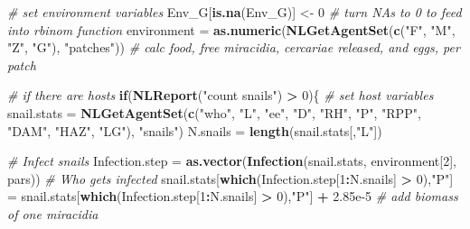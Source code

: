 \documentclass[10,portrait]{article}
\newenvironment{Shaded}{\begin{snugshade}}{\end{snugshade}}
\newcommand{\KeywordTok}[1]{\textcolor[rgb]{0.13,0.29,0.53}{\textbf{#1}}}
\newcommand{\DecValTok}[1]{\textcolor[rgb]{0.00,0.00,0.81}{#1}}
\newcommand{\FloatTok}[1]{\textcolor[rgb]{0.00,0.00,0.81}{#1}}
\newcommand{\StringTok}[1]{\textcolor[rgb]{0.31,0.60,0.02}{#1}}
\newcommand{\CommentTok}[1]{\textcolor[rgb]{0.56,0.35,0.01}{\textit{#1}}}
\newcommand{\ControlFlowTok}[1]{\textcolor[rgb]{0.13,0.29,0.53}{\textbf{#1}}}
\newcommand{\OperatorTok}[1]{\textcolor[rgb]{0.81,0.36,0.00}{\textbf{#1}}}
\newcommand{\NormalTok}[1]{#1}
\begin{document}
\begin{Shaded}
\begin{Highlighting}[]
{{{{{                      \CommentTok{# set environment variables }
\NormalTok{                      Env_G[}\KeywordTok{is.na}\NormalTok{(Env_G)] <-}\StringTok{ }\DecValTok{0} \CommentTok{# turn NAs to 0 to feed into rbinom function }
\NormalTok{                      environment =}\StringTok{ }\KeywordTok{as.numeric}\NormalTok{(}\KeywordTok{NLGetAgentSet}\NormalTok{(}\KeywordTok{c}\NormalTok{(}\StringTok{"F"}\NormalTok{, }\StringTok{"M"}\NormalTok{, }\StringTok{"Z"}\NormalTok{, }\StringTok{"G"}\NormalTok{), }\StringTok{"patches"}\NormalTok{)) }\CommentTok{# calc food, free miracidia, cercariae released, and eggs, per patch}
                      
                      \CommentTok{# if there are hosts }
                      \ControlFlowTok{if}\NormalTok{(}\KeywordTok{NLReport}\NormalTok{(}\StringTok{"count snails"}\NormalTok{) }\OperatorTok{>}\StringTok{ }\DecValTok{0}\NormalTok{)\{}
                        \CommentTok{# set host variables}
\NormalTok{                        snail.stats =}\StringTok{ }\KeywordTok{NLGetAgentSet}\NormalTok{(}\KeywordTok{c}\NormalTok{(}\StringTok{"who"}\NormalTok{, }\StringTok{"L"}\NormalTok{, }\StringTok{"ee"}\NormalTok{, }\StringTok{"D"}\NormalTok{, }\StringTok{"RH"}\NormalTok{, }\StringTok{"P"}\NormalTok{, }\StringTok{"RPP"}\NormalTok{, }\StringTok{"DAM"}\NormalTok{, }\StringTok{"HAZ"}\NormalTok{, }\StringTok{"LG"}\NormalTok{), }\StringTok{"snails"}\NormalTok{)}
\NormalTok{                        N.snails =}\StringTok{ }\KeywordTok{length}\NormalTok{(snail.stats[,}\StringTok{"L"}\NormalTok{])}
                        
                        \CommentTok{# Infect snails}
\NormalTok{                        Infection.step =}\StringTok{ }\KeywordTok{as.vector}\NormalTok{(}\KeywordTok{Infection}\NormalTok{(snail.stats, environment[}\DecValTok{2}\NormalTok{], pars)) }\CommentTok{# Who gets infected}
\NormalTok{                        snail.stats[}\KeywordTok{which}\NormalTok{(Infection.step[}\DecValTok{1}\OperatorTok{:}\NormalTok{N.snails] }\OperatorTok{>}\StringTok{ }\DecValTok{0}\NormalTok{),}\StringTok{"P"}\NormalTok{] =}\StringTok{ }\NormalTok{snail.stats[}\KeywordTok{which}\NormalTok{(Infection.step[}\DecValTok{1}\OperatorTok{:}\NormalTok{N.snails] }\OperatorTok{>}\StringTok{ }\DecValTok{0}\NormalTok{),}\StringTok{"P"}\NormalTok{] }\OperatorTok{+}\StringTok{ }\FloatTok{2.85e-5} \CommentTok{# add biomass of one miracidia}
                        
}}}}}
\end{Highlighting}
\end{Shaded}
\end{document}
